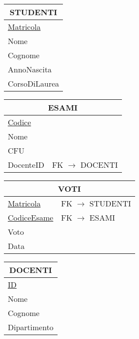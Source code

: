 \begin{table}[htbp]
    \centering
    \begin{tabular}{|l|}
        \hline
        \multicolumn{1}{|c|}{\textbf{STUDENTI}} \\
        \hline
        \underline{Matricola} \\
        Nome \\
        Cognome \\
        AnnoNascita \\
        CorsoDiLaurea \\
        \hline
    \end{tabular}
    \hspace{1cm}
    \begin{tabular}{|l|l|}
        \hline
        \multicolumn{2}{|c|}{\textbf{ESAMI}} \\
        \hline
        \underline{Codice} & \\
        Nome & \\
        CFU & \\
        DocenteID & FK $\rightarrow$ DOCENTI \\
        \hline
    \end{tabular}

    \vspace{0.5cm}

    \begin{tabular}{|l|l|}
        \hline
        \multicolumn{2}{|c|}{\textbf{VOTI}} \\
        \hline
        \underline{Matricola} & FK $\rightarrow$ STUDENTI \\
        \underline{CodiceEsame} & FK $\rightarrow$ ESAMI \\
        Voto & \\
        Data & \\
        \hline
    \end{tabular}
    \hspace{1cm}
    \begin{tabular}{|l|}
        \hline
        \multicolumn{1}{|c|}{\textbf{DOCENTI}} \\
        \hline
        \underline{ID} \\
        Nome \\
        Cognome \\
        Dipartimento \\
        \hline
    \end{tabular}
\end{table}

